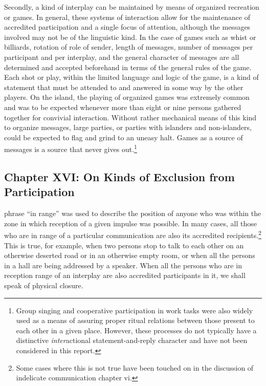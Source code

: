 \documentclass[twoside,symmetric,nobib,justified]{tufte-book}
\let\oldchapter\chapter
\def\chapter{%
  \setcounter{footnote}{0}%
  \oldchapter
}
\begin{document}
Secondly, a kind of interplay can be maintained by means of organized
recreation or games. In general, these systems of interaction allow for
the maintenance of accredited participation and a single focus of
attention, although the messages involved may not be of the linguistic
kind. In the case of games such as whist or billiards, rotation of role
of sender, length of messages, number of messages per participant and
per interplay, and the general character of messages are all determined
and accepted beforehand in terms of the general rules of the game. Each
shot or play, within the limited language and logic of the game, is a
kind of statement that must be attended to and answered in some way by
the other players. On the island, the playing of organized games was
extremely common and was to be expected whenever more than eight or nine
persons gathered together for convivial interaction. Without rather
mechanical means of this kind to organize messages, large parties, or
parties with islanders and non-islanders, could be expected to flag and
grind to an uneasy halt. Games as a source of messages is a source that
never gives out.\footnote{Group singing and cooperative participation in
  work tasks were also widely used as a means of assuring proper ritual
  relations between those present to each other in a given place.
  However, these processes do not typically have a distinctive
  \emph{inter}actional statement-and-reply character and have not been
  considered in this report.}

\begin{fullwidth}

\chapter[CHAPTER XVI: ON KINDS OF EXCLUSION FROM PARTICIPATION]{Chapter XVI: On Kinds of Exclusion from Participation}
\label{ch:Chapter XVI: On Kinds of Exclusion from Participation}

\end{fullwidth}

 phrase ``in range'' was used to describe the
position of anyone who was within the zone in which reception of a given
impulse was possible. In many cases, all those who are in range of a
particular communication are also its accredited recipients.\footnote{Some
  cases where this is not true have been touched on in the discussion of
  indelicate communication chapter vi.} This is true, for example, when
two persons stop to talk to each other on an otherwise deserted road or
in an otherwise empty room, or when all the persons in a hall are being
addressed by a speaker. When all the persons who are in reception range
of an interplay are also accredited participants in it, we shall speak
of physical closure.
\end{document}
